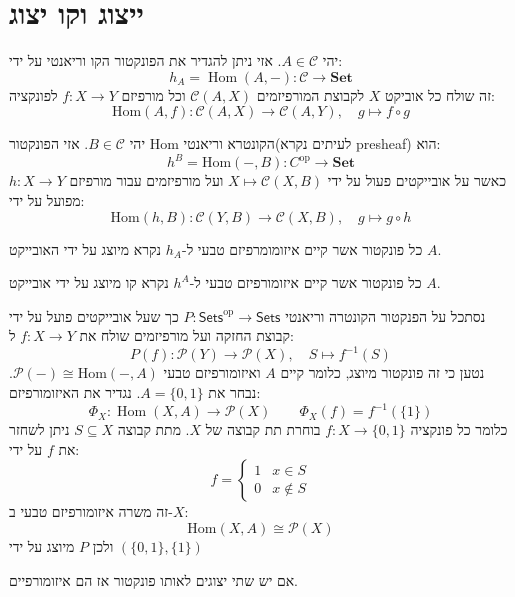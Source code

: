 \documentclass{tstextbook}
\begin{document}
\section{ייצוג וקו יצוג}

\begin{definition}
יהי \(A \in \mathcal{C}\). אזי ניתן להגדיר את הפונקטור הקו וריאנטי על ידי:
$$h_{A}=\operatorname{Hom}(A,-)\colon{\mathcal{C}}\to\mathbf{Set}$$
זה שולח כל אוביקט \(X\) לקבוצת המורפיזמים \(\mathcal{C}(A,X)\) וכל מורפיזם \(f:X\to Y\) לפונקציה:
$$\mathrm{Hom}(A,f)\colon{\mathcal{C}}(A,X)\to{\mathcal{C}}(A,Y),\quad g\mapsto f\circ g$$

\end{definition}
\begin{definition}
יהי \(B \in \mathcal{C}\). אזי הפונקטור Hom הקונטרא וריאנטי(לעיתים נקרא presheaf) הוא:
$$h^{B}=\mathrm{Hom}(-,B)\colon C^{\mathrm{op}}\to\mathbf{Set}$$
כאשר על אובייקטים פעול על ידי \(X\mapsto \mathcal{C}(X,B)\) ועל מורפיזמים עבור מורפיזם \(h:X\to Y\) מפועל על ידי:
$$\mathrm{Hom}(h,B)\colon{\mathcal{C}}(Y,B)\to{\mathcal{C}}(X,B),\quad g\mapsto g\circ h$$

\end{definition}
\begin{definition}
כל פונקטור אשר קיים איזומומרפיזם טבעי ל-\(h_{A}\) נקרא מיוצג על ידי האובייקט \(A\).

\end{definition}
\begin{definition}
כל פונקטור אשר קיים איזומורפיזם טבעי ל-\(h^{A}\) נקרא קו מיוצג על ידי אובייקט \(A\).

\end{definition}
\begin{example}
נסתכל על הפנקטור הקונטרה וריאנטי \(P:\mathsf{Sets}^{\mathrm{op}}\to \mathsf{Sets}\) כך שעל אובייקטים פועל על ידי קבוצת החזקה ועל מורפיזמים שולח את \(f:X\to Y\) ל:
$$P(f):{\mathcal{P}}(Y)\to{\mathcal{P}}(X),\quad S\mapsto f^{-1}(S)$$
נטען כי זה פונקטור מיוצג, כלומר קיים \(A\) ואיזומורפיזם טבעי \(\mathcal{P}(-)\cong \mathrm{Hom}(-,A)\). נבחר את \(A=\{ 0,1 \}\). נגדיר את האיזומורפיזם:
$$\Phi_{X}\colon\operatorname{Hom}(X,A)\longrightarrow{\mathcal{P}}(X)\qquad \Phi_{X}(f)=f^{-1}(\{1\})$$
כלומר כל פונקציה \(f:X\to \{ 0,1 \}\) בוחרת תת קבוצה של \(X\). מתת קבוצה \(S\subseteq X\) ניתן לשחזר את \(f\) על ידי:
$$f=\begin{cases}1 & x \in S \\0 & x \not \in S
\end{cases}$$
זה משרה איזומורפיזם טבעי ב-\(X\):
$${\mathrm{Hom}}(X,A)\cong{\mathcal{P}}(X)$$
ולכן \(P\) מיוצג על ידי \(\left( \{ 0,1 \},\{ 1 \} \right)\)

\end{example}
\begin{proposition}
אם יש שתי יצוגים לאותו פונקטור אז הם איזומורפיים.

\end{proposition}
\end{document}
